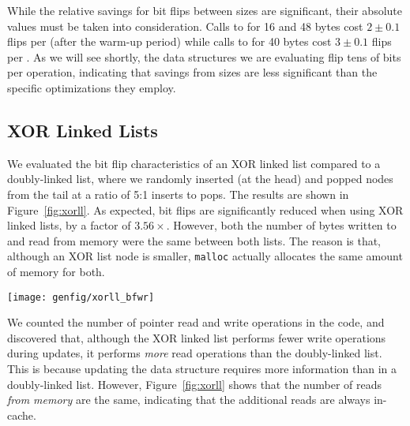 While the relative savings for bit flips between \malloc sizes are significant,
their absolute values must be taken into consideration. Calls to \malloc for 16
and 48
bytes cost $2\pm0.1$ flips per \malloc (after the warm-up period) while calls to
\malloc for 40 bytes cost $3 \pm 0.1$ flips per \malloc.
As we will see shortly, the data structures we are evaluating flip tens of bits
per operation, indicating that savings from \malloc sizes are less significant
than the specific optimizations they employ.





\subsection{XOR Linked Lists}


We evaluated the bit flip characteristics of an XOR linked list compared to a
doubly-linked list, where we randomly inserted (at the head) and popped nodes from the tail
at a ratio of 5:1 inserts to pops.
The results are shown in
Figure~\ref{fig:xorll}. As expected, bit flips are significantly reduced when
using XOR linked lists, by a factor of $3.56\times$. However, both the number of bytes written to
and read from memory were the same between both lists. The reason is that,
although an XOR list node is smaller, \texttt{malloc} actually allocates the
same amount of memory for both.

\begin{SCfigure}
	\centering
	\texttt{[image: genfig/xorll\_bfwr]}
	\caption{Memory characteristics of of XOR linked lists compared to Doubly-Linked
		Lists.}
	\label{fig:xorll}
\end{SCfigure}


We counted the number of pointer read and write operations in the code,
and discovered that, although the XOR linked list performs fewer write
operations during updates, it performs \textit{more} read operations than the
doubly-linked list. This is because updating the data structure requires more
information than in a doubly-linked list. However, Figure~\ref{fig:xorll} shows
that the number of reads \textit{from memory} are the same, indicating that the
additional reads are always in-cache.

